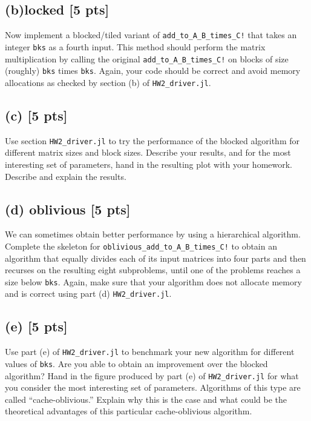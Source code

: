 \documentclass[twoside,10pt]{article}
\begin{document}
\subsection*{(b)locked [5 pts]} 
Now implement a blocked/tiled variant of \texttt{add\_to\_A\_B\_times\_C!} that takes an integer \texttt{bks} as a fourth input.
This method should perform the matrix multiplication by calling the original \texttt{add\_to\_A\_B\_times\_C!} on blocks of size (roughly) \texttt{bks} times \texttt{bks}.
Again, your code should be correct and avoid memory allocations as checked by section (b) of \texttt{HW2\_driver.jl}.

\subsection*{(c) [5 pts]}
Use section \texttt{HW2\_driver.jl} to try the performance of the blocked algorithm for different matrix sizes and block sizes. 
Describe your results, and for the most interesting set of parameters, hand in the resulting plot with your homework.
Describe and explain the results.

\subsection*{(d) oblivious [5 pts]}
We can sometimes obtain better performance by using a hierarchical algorithm. 
Complete the skeleton for \texttt{oblivious\_add\_to\_A\_B\_times\_C!} to obtain an algorithm that equally divides each of its input matrices into four parts and then recurses on the resulting eight subproblems, until one of the problems reaches a size below \texttt{bks}.
Again, make sure that your algorithm does not allocate memory and is correct using part (d) \texttt{HW2\_driver.jl}.

\subsection*{(e) [5 pts]} Use part (e) of \texttt{HW2\_driver.jl} to benchmark your new algorithm for different values of \texttt{bks}. 
Are you able to obtain an improvement over the blocked algorithm? 
Hand in the figure produced by part (e) of \texttt{HW2\_driver.jl} for what you consider the most interesting set of parameters.
Algorithms of this type are called ``cache-oblivious.'' 
Explain why this is the case and what could be the theoretical advantages of this particular cache-oblivious algorithm.
\end{document}
